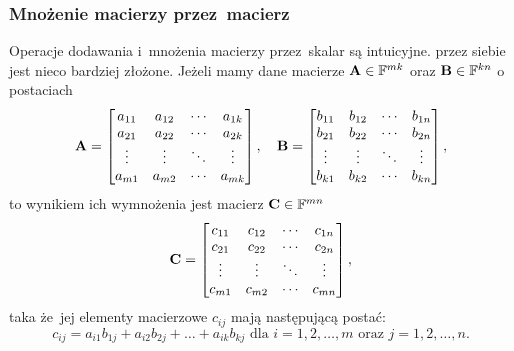 \subsubsection{Mnożenie macierzy przez~macierz}
Operacje dodawania i~mnożenia macierzy przez~skalar są intuicyjne.
 przez siebie
jest nieco bardziej złożone. Jeżeli mamy dane macierze $\mathbf{A}\in\mathbb{F}^{mk}$ oraz
$\mathbf{B}\in\mathbb{F}^{kn}$ o postaciach
$$
	\mathbf{A} =
	\begin{bmatrix}
		a_{11} & a_{12} & \cdots & a_{1k} \\
		a_{21} & a_{22} & \cdots & a_{2k} \\
		\vdots & \vdots & \ddots & \vdots \\
		a_{m1} & a_{m2} & \cdots & a_{mk}
	\end{bmatrix}, \quad
	\mathbf{B} =
	\begin{bmatrix}
		b_{11} & b_{12} & \cdots & b_{1n} \\
		b_{21} & b_{22} & \cdots & b_{2n} \\
		\vdots & \vdots & \ddots & \vdots \\
		b_{k1} & b_{k2} & \cdots & b_{kn}
	\end{bmatrix},
$$
to wynikiem ich wymnożenia jest macierz $\mathbf{C}\in\mathbb{F}^{mn}$
$$
	\mathbf{C} =
	\begin{bmatrix}
		c_{11} & c_{12} & \cdots & c_{1n} \\
		c_{21} & c_{22} & \cdots & c_{2n} \\
		\vdots & \vdots & \ddots & \vdots \\
		c_{m1} & c_{m2} & \cdots & c_{mn}
	\end{bmatrix},
$$
taka że~jej elementy macierzowe $c_{ij}$ mają następującą postać:
$$c_{ij}=a_{i1}b_{1j} + a_{i2}b_{2j} + \dots + a_{ik}b_{kj} \text{ dla } i=1,2,\dots, m \text{ oraz } j=1,2,\dots, n.$$


